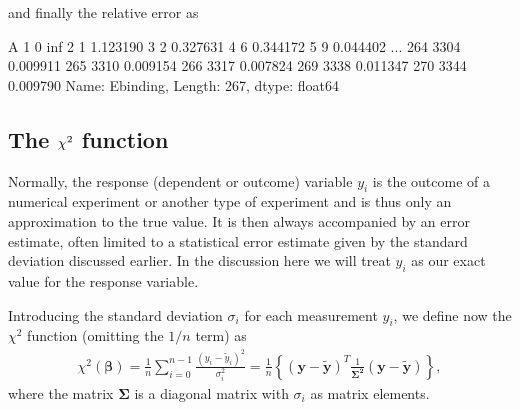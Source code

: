 \documentclass[letterpaper,10pt,english]{sphinxmanual}
\begin{document}
and finally the relative error as

\begin{sphinxVerbatim}[commandchars=\\\{\}]
 
     
 
\end{sphinxVerbatim}

\begin{sphinxVerbatim}[commandchars=\\\{\}]
A        
1    0            inf
2    1       1.123190
3    2       0.327631
4    6       0.344172
5    9       0.044402
               ...   
264  3304    0.009911
265  3310    0.009154
266  3317    0.007824
269  3338    0.011347
270  3344    0.009790
Name: Ebinding, Length: 267, dtype: float64
\end{sphinxVerbatim}


\subsection{The \protect\(\chi^2\protect\) function}
\label{\detokenize{chapter4:the-chi-2-function}}
Normally, the response (dependent or outcome) variable \(y_i\) is the
outcome of a numerical experiment or another type of experiment and is
thus only an approximation to the true value. It is then always
accompanied by an error estimate, often limited to a statistical error
estimate given by the standard deviation discussed earlier. In the
discussion here we will treat \(y_i\) as our exact value for the
response variable.

Introducing the standard deviation \(\sigma_i\) for each measurement
\(y_i\), we define now the \(\chi^2\) function (omitting the \(1/n\) term)
as
\begin{equation*}
\begin{split}
\chi^2(\boldsymbol{\beta})=\frac{1}{n}\sum_{i=0}^{n-1}\frac{\left(y_i-\tilde{y}_i\right)^2}{\sigma_i^2}=\frac{1}{n}\left\{\left(\boldsymbol{y}-\boldsymbol{\tilde{y}}\right)^T\frac{1}{\boldsymbol{\Sigma^2}}\left(\boldsymbol{y}-\boldsymbol{\tilde{y}}\right)\right\},
\end{split}
\end{equation*}
where the matrix \(\boldsymbol{\Sigma}\) is a diagonal matrix with \(\sigma_i\) as matrix elements.
\end{document}

